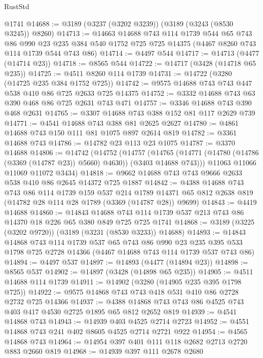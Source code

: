 \begin{lexlean}{RustStd}
\begin{coremodule}
    @1741
@14688 := @3189 (@3237 (@3202 @3239)) (@3189 (@3243 (@8530 @3245)) @8260)
@14713 := @14663
    @14688
    @743
    @114
    @1739
    @544
    @65
    @743
    @86
    @990
    @23
    @235
    @384
    @540
    @1752
    @725
    @725
    @14375
    (@4467 @8260 @743 @114 @1739 @544 @743 @86)
@14714 := @4497 @544
@14717 := @14713 (@4477 (@14714 @23))
@14718 := @8565 @544
@14722 := @14717 (@3428 (@14718 @65 @235))
@14725 := @4511 @8260 @114 @1739
@14731 := @14722 (@3280 (@14725 @235 @384 @1752 @725))
@14742 := @9575 @14688 @743 @743 @447 @538 @410 @86 @725 @2633 @725 @14375
@14752 := @3332 @14688 @743 @63 @390 @468 @86 @725 @2631 @743 @471
@14757 := @3346 @14688 @743 @390 @468 @2631
@14765 := @3307 @14688 @743 @388 @152 @81 @117 @2629 @739
@14771 := @4541 @14688 @743 @388 @81 @2625 @2627
@14780 := @4861 @14688 @743 @150 @111 @81 @1075 @897 @2614 @819
@14782 := @3361 @14688 @743
@14786 := @14782 @23 @113 @23 @1075
@14787 := @3370 @14688
@14806 := @14742
    (@14752
      (@14757
        (@14765 (@14771 (@14780 (@14786 (@3369 (@14787 @23)) @5660) @4630)) (@3403 @14688 @743)))
      @11063
      @11066
      @11069
      @11072
      @3434)
@14818 := @9662 @14688 @743 @743 @9666 @2633 @538 @410 @86 @2645 @14372 @725 @1887
@14842 := @4388
    @14688
    @743
    @743
    @86
    @114
    @1739
    @159
    @537
    @214
    @1789
    @14371
    @65
    @812
    @2638
    @819
    (@14782 @28 @114 @28 @1789 (@3369 (@14787 @28)) @9699)
@14843 := @4419 @14688
@14860 := @14843
    @14688
    @743
    @114
    @1739
    @537
    @213
    @743
    @86
    @14370
    @18
    @226
    @65
    @380
    @849
    @725
    @725
    @1741
@14868 := @3189 (@3225 (@3202 @9720)) (@3189 (@3231 (@8530 @3233)) @14688)
@14893 := @14843
    @14868
    @743
    @114
    @1739
    @537
    @65
    @743
    @86
    @990
    @23
    @235
    @395
    @533
    @1798
    @725
    @2728
    @14366
    (@4467 @14688 @743 @114 @1739 @537 @743 @86)
@14894 := @4497 @537
@14897 := @14893 (@4477 (@14894 @23))
@14898 := @8565 @537
@14902 := @14897 (@3428 (@14898 @65 @235))
@14905 := @4511 @14688 @114 @1739
@14911 := @14902 (@3280 (@14905 @235 @395 @1798 @725))
@14922 := @9575 @14868 @743 @743 @418 @531 @410 @86 @2728 @2732 @725 @14366
@14937 := @4388 @14868 @743 @743 @86 @4525 @743 @403 @417 @4530 @2725 @1895 @65 @812 @2652 @819
@14939 := @4541 @14868 @743
@14943 := @14939 @403 @4525 @2714 @2723
@14952 := @4551 @14868 @743 @241 @402 @8605 @4525 @2714 @2721 @922
@14954 := @4565 @14868 @743
@14964 := @14954 @397 @401 @111 @118 @2682 @2713 @2720 @883 @2660 @819
@14968 := @14939 @397 @111 @2678 @2680

\end{coremodule}
\end{lexlean}
